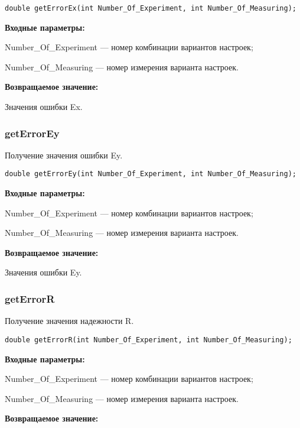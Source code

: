 \documentclass[a4paper,12pt]{article}
\begin{document}
\begin{lstlisting}[label=code_syntax_getErrorEx,caption=Синтаксис]
double getErrorEx(int Number_Of_Experiment, int Number_Of_Measuring);
\end{lstlisting}

\textbf{Входные параметры:}

Number\_Of\_Experiment --- номер комбинации вариантов настроек;

Number\_Of\_Measuring --- номер измерения варианта настроек.

\textbf{Возвращаемое значение:}


Значения ошибки Ex.


\subsubsection{getErrorEy}\label{getErrorEy}

Получение значения ошибки Ey.


\begin{lstlisting}[label=code_syntax_getErrorEy,caption=Синтаксис]
double getErrorEy(int Number_Of_Experiment, int Number_Of_Measuring);
\end{lstlisting}

\textbf{Входные параметры:}

Number\_Of\_Experiment --- номер комбинации вариантов настроек;

Number\_Of\_Measuring --- номер измерения варианта настроек.

\textbf{Возвращаемое значение:}


Значения ошибки Ey.


\subsubsection{getErrorR}\label{getErrorR}

Получение значения надежности R.


\begin{lstlisting}[label=code_syntax_getErrorR,caption=Синтаксис]
double getErrorR(int Number_Of_Experiment, int Number_Of_Measuring);
\end{lstlisting}

\textbf{Входные параметры:}

Number\_Of\_Experiment --- номер комбинации вариантов настроек;

Number\_Of\_Measuring --- номер измерения варианта настроек.

\textbf{Возвращаемое значение:}
\end{document}
